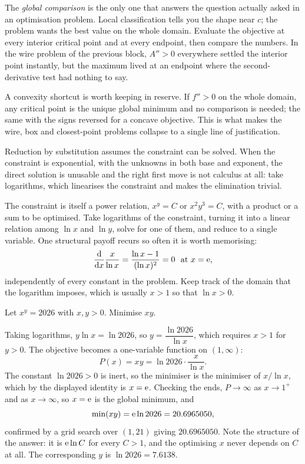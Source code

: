 The \emph{global comparison} is the only one that answers the question actually asked in an optimisation problem. Local classification tells you the shape near $c$; the problem wants the best value on the whole domain. Evaluate the objective at every interior critical point and at every endpoint, then compare the numbers. In the wire problem of the previous block, $A''>0$ everywhere settled the interior point instantly, but the maximum lived at an endpoint where the second-derivative test had nothing to say.

A convexity shortcut is worth keeping in reserve. If $f''>0$ on the whole domain, any critical point is the unique global minimum and no comparison is needed; the same with the signs reversed for a concave objective. This is what makes the wire, box and closest-point problems collapse to a single line of justification.

Reduction by substitution assumes the constraint can be solved. When the constraint is exponential, with the unknowns in both base and exponent, the direct solution is unusable and the right first move is not calculus at all: take logarithms, which linearises the constraint and makes the elimination trivial.

\cue The constraint is itself a power relation, $x^{y}=C$ or $x^{2}y^{3}=C$, with a product or a sum to be optimised.
\method Take logarithms of the constraint, turning it into a linear relation among $\ln x$ and $\ln y$, solve for one of them, and reduce to a single variable. One structural payoff recurs so often it is worth memorising:
\[
\frac{\mathrm{d}}{\mathrm{d}x}\frac{x}{\ln x}=\frac{\ln x-1}{(\ln x)^{2}}=0\ \text{ at } x=\mathrm{e} ,
\]
independently of every constant in the problem. Keep track of the domain that the logarithm imposes, which is usually $x>1$ so that $\ln x>0$.

\begin{worked}
Let $x^{y}=2026$ with $x,y>0$. Minimise $xy$.

Taking logarithms, $y\ln x=\ln2026$, so $y=\dfrac{\ln2026}{\ln x}$, which requires $x>1$ for $y>0$. The objective becomes a one-variable function on $(1,\infty)$:
\[
P(x)=xy=\ln2026\cdot\frac{x}{\ln x} .
\]
The constant $\ln2026>0$ is inert, so the minimiser is the minimiser of $x/\ln x$, which by the displayed identity is $x=\mathrm{e}$. Checking the ends, $P\to\infty$ as $x\to1^{+}$ and as $x\to\infty$, so $x=\mathrm{e}$ is the global minimum, and
\[
\min(xy)=\mathrm{e}\ln2026=20.6965050 ,
\]
confirmed by a grid search over $(1,21)$ giving $20.6965050$. Note the structure of the answer: it is $\mathrm{e}\ln C$ for every $C>1$, and the optimising $x$ never depends on $C$ at all. The corresponding $y$ is $\ln 2026=7.6138$.
\end{worked}

